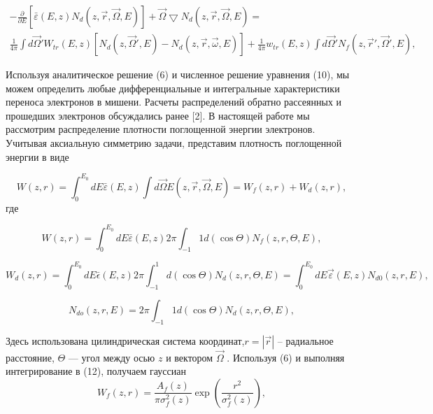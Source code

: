 \begin{gather}
-\frac{\partial}{\partial E}[\bar{\varepsilon}(E,z)N_d(z,\vec{r},\vec{\Omega},E)]+\vec{\Omega} \bigtriangledown N_d (z,\vec{r},\vec{\Omega},E)= \nonumber \\
\frac{1}{4\pi} \int d\vec{\Omega}'W_{tr}(E,z)[N_d(z,\vec{\Omega}',E)-N_d(z,\vec{r},\vec{\omega},E)]+\frac{1}{4\pi}w_{tr}(E,z) \int d\vec{\Omega}'N_f(z,\vec{r}',\vec{\Omega}',E),
\label{eq:10}
\end{gather}


Используя аналитическое решение (6) и численное решение уравнения (10), мы
можем определить любые дифференциальные и интегральные характеристики переноса
электронов в мишени. Расчеты распределений обратно рассеянных и прошедших
электронов обсуждались ранее [2]. В настоящей работе мы рассмотрим распределение
плотности поглощенной энергии электронов.
Учитывая аксиальную симметрию задачи, представим плотность поглощенной
энергии в виде

\begin{equation}
W(z,r)=\int_{0}^{E_0} dE\bar{\varepsilon}(E,z) \int d\vec{\Omega}E(z,\vec{r},\vec{\Omega},E)=W_f(z,r)+W_d(z,r),
\label{eq:11}
\end{equation}
где

\begin{equation}
W(z,r)=\int_{0}^{E_0} dE\bar{\varepsilon}(E,z)2\pi \int_{-1}{1} d(\cos \Theta)N_f(z,r,\Theta ,E),
\label{eq:12}
\end{equation}

\begin{equation}
W_{d}(z,r)=\int_{0}^{E_0} dE\bar{\epsilon}(E,z)2\pi \int_{-1}^{1} d(\cos \Theta)N_d(z,r,\Theta ,E)=\int_{0}^{E_0}dE\vec{\varepsilon}(E,z)N_{d0}(z,r,E),
\label{eq:13}
\end{equation}

\begin{equation}
N_{do}(z,r,E)=2\pi \int_{-1}{1} d(\cos \Theta)N_d(z,r,\Theta,E),
\label{eq:14}
\end{equation}

Здесь использована цилиндрическая система координат,$r=|\vec{r}|$ -- радиальное
расстояние, $\Theta$ — угол между осью $z$ и вектором $\vec{\Omega}$ .
Используя (6) и выполняя интегрирование в (12), получаем гауссиан
\begin{equation}
W_f(z,r)=\frac{A_f(z)}{\pi \sigma_f^2(z)} \exp \left(\frac{r^2}{\sigma_f^2(z)}\right),
\label{eq:15}
\end{equation}

